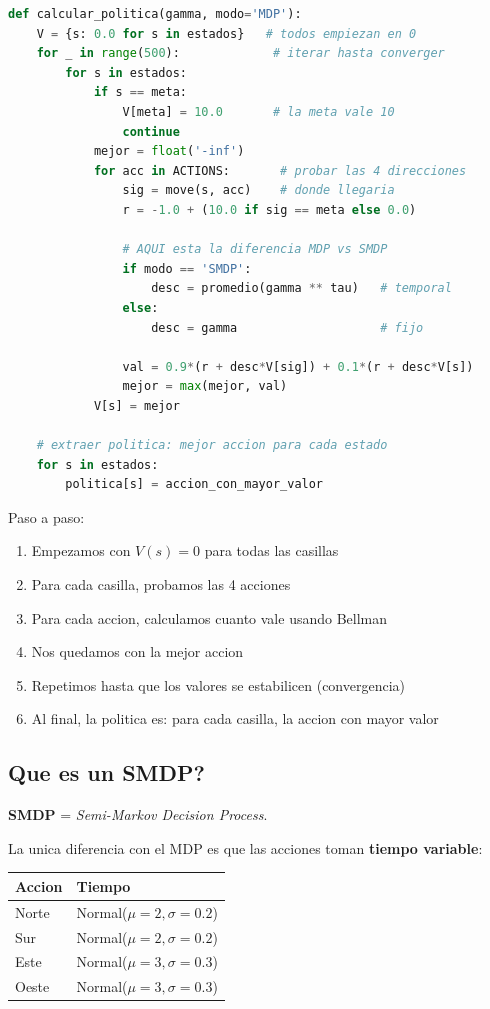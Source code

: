 \documentclass[11pt,a4paper]{article}
\begin{document}
\begin{lstlisting}[language=Python]
def calcular_politica(gamma, modo='MDP'):
    V = {s: 0.0 for s in estados}   # todos empiezan en 0
    for _ in range(500):             # iterar hasta converger
        for s in estados:
            if s == meta:
                V[meta] = 10.0       # la meta vale 10
                continue
            mejor = float('-inf')
            for acc in ACTIONS:       # probar las 4 direcciones
                sig = move(s, acc)    # donde llegaria
                r = -1.0 + (10.0 if sig == meta else 0.0)

                # AQUI esta la diferencia MDP vs SMDP
                if modo == 'SMDP':
                    desc = promedio(gamma ** tau)   # temporal
                else:
                    desc = gamma                    # fijo

                val = 0.9*(r + desc*V[sig]) + 0.1*(r + desc*V[s])
                mejor = max(mejor, val)
            V[s] = mejor

    # extraer politica: mejor accion para cada estado
    for s in estados:
        politica[s] = accion_con_mayor_valor
\end{lstlisting}

Paso a paso:
\begin{enumerate}
    \item Empezamos con $V(s) = 0$ para todas las casillas
    \item Para cada casilla, probamos las 4 acciones
    \item Para cada accion, calculamos cuanto vale usando Bellman
    \item Nos quedamos con la mejor accion
    \item Repetimos hasta que los valores se estabilicen (convergencia)
    \item Al final, la politica es: para cada casilla, la accion con mayor valor
\end{enumerate}

\newpage

\subsection{Que es un SMDP?}

\textbf{SMDP} = \textit{Semi-Markov Decision Process}.

La unica diferencia con el MDP es que las acciones toman \textbf{tiempo variable}:

\begin{center}
\begin{tabular}{l l}
\toprule
\rowcolor{tabheader}
Accion & Tiempo \\
\midrule
Norte & Normal($\mu=2, \sigma=0.2$) \\
Sur & Normal($\mu=2, \sigma=0.2$) \\
Este & Normal($\mu=3, \sigma=0.3$) \\
Oeste & Normal($\mu=3, \sigma=0.3$) \\
\bottomrule
\end{tabular}
\end{center}
\end{document}

